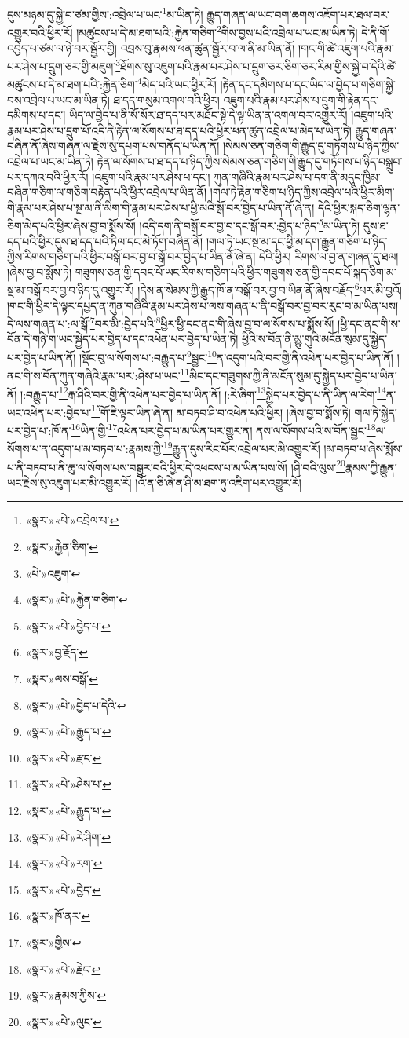 དུས་མཉམ་དུ་སྐྱེ་བ་ཙམ་གྱིས་:འབྲེལ་པ་ཡང་\footnote{«སྣར་»«པེ་»འབྲེལ་པ་}མ་ཡིན་ཏེ། རྒྱུད་གཞན་ལ་ཡང་བག་ཆགས་འཇོག་པར་ཐལ་བར་འགྱུར་བའི་ཕྱིར་རོ། །མཚུངས་པ་དེ་མ་ཐག་པའི་:རྐྱེན་གཅིག་\footnote{«སྣར་»རྐྱེན་ཅིག་}གིས་བྱས་པའི་འབྲེལ་པ་ཡང་མ་ཡིན་ཏེ། དེ་ནི་གོ་འབྱེད་པ་ཙམ་ལ་ཉེ་བར་སྦྱོར་གྱི། འབྲས་བུ་རྣམས་ཕན་ཚུན་སྦྱོར་བ་ལ་ནི་མ་ཡིན་ནོ། །གང་གི་ཚེ་འཇུག་པའི་རྣམ་པར་ཤེས་པ་དྲུག་ཅར་གྱི་མཇུག་\footnote{«པེ་»འཇུག་}ཐོགས་སུ་འཇུག་པའི་རྣམ་པར་ཤེས་པ་དྲུག་ཅར་ཅིག་ཅར་རིམ་གྱིས་སྐྱེ་བ་དེའི་ཚེ་མཚུངས་པ་དེ་མ་ཐག་པའི་:རྐྱེན་ཅིག་\footnote{«སྣར་»«པེ་»རྐྱེན་གཅིག་}མེད་པའི་ཡང་ཕྱིར་རོ། །རྟེན་དང་དམིགས་པ་དང་ཡིད་ལ་བྱེད་པ་གཅིག་སྐྱེ་བས་འབྲེལ་པ་ཡང་མ་ཡིན་ཏེ། ཐ་དད་གསུམ་འགལ་བའི་ཕྱིར། འཇུག་པའི་རྣམ་པར་ཤེས་པ་དྲུག་གི་རྟེན་དང་དམིགས་པ་དང་། ཡིད་ལ་བྱེད་པ་ནི་སོ་སོར་ཐ་དད་པར་མཐོང་སྟེ་དེ་ལྟ་ཡིན་ན་འགལ་བར་འགྱུར་རོ། །འཇུག་པའི་རྣམ་པར་ཤེས་པ་དྲུག་པོ་འདི་ནི་རྟེན་ལ་སོགས་པ་ཐ་དད་པའི་ཕྱིར་ཕན་ཚུན་འབྲེལ་པ་མེད་པ་ཡིན་ཏེ། རྒྱུད་གཞན་བཞིན་ནོ་ཞེས་གཞན་ལ་རྗེས་སུ་དཔག་པས་གནོད་པ་ཡིན་ནོ། །སེམས་ཅན་གཅིག་གི་རྒྱུད་དུ་གཏོགས་པ་ཉིད་ཀྱིས་འབྲེལ་པ་ཡང་མ་ཡིན་ཏེ། རྟེན་ལ་སོགས་པ་ཐ་དད་པ་ཉིད་ཀྱིས་སེམས་ཅན་གཅིག་གི་རྒྱུད་དུ་གཏོགས་པ་ཉིད་བསྒྲུབ་པར་དཀའ་བའི་ཕྱིར་རོ། །འཇུག་པའི་རྣམ་པར་ཤེས་པ་དང་། ཀུན་གཞིའི་རྣམ་པར་ཤེས་པ་དག་ནི་མདུང་ཁྱིམ་བཞིན་གཅིག་ལ་གཅིག་བརྟེན་པའི་ཕྱིར་འབྲེལ་པ་ཡིན་ནོ། །གལ་ཏེ་རྟེན་གཅིག་པ་ཉིད་ཀྱིས་འབྲེལ་པའི་ཕྱིར་མིག་གི་རྣམ་པར་ཤེས་པ་སྔ་མ་ནི་མིག་གི་རྣམ་པར་ཤེས་པ་ཕྱི་མའི་སྒོ་བར་བྱེད་པ་ཡིན་ནོ་ཞེ་ན། དེའི་ཕྱིར་སྐད་ཅིག་ལྷན་ཅིག་མེད་པའི་ཕྱིར་ཞེས་བྱ་བ་སྨོས་སོ། །འདི་དག་ནི་བསྒོ་བར་བྱ་བ་དང་སྒོ་བར་:བྱེད་པ་ཉིད་\footnote{«སྣར་»«པེ་»བྱེད་པ་}མ་ཡིན་ཏེ། དུས་ཐ་དད་པའི་ཕྱིར་དུས་ཐ་དད་པའི་ཏིལ་དང་མེ་ཏོག་བཞིན་ནོ། །གལ་ཏེ་ཡང་སྔ་མ་དང་ཕྱི་མ་དག་རྒྱུན་གཅིག་པ་ཉིད་ཀྱིས་རིགས་གཅིག་པའི་ཕྱིར་བསྒོ་བར་བྱ་བ་སྒོ་བར་བྱེད་པ་ཡིན་ནོ་ཞེ་ན། དེའི་ཕྱིར། རིགས་ལ་བྱ་ན་གཞན་དུ་ཐལ། །ཞེས་བྱ་བ་སྨོས་ཏེ། གཟུགས་ཅན་གྱི་དབང་པོ་ཡང་རིགས་གཅིག་པའི་ཕྱིར་གཟུགས་ཅན་གྱི་དབང་པོ་སྐད་ཅིག་མ་སྔ་མ་བསྒོ་བར་བྱ་བ་ཉིད་དུ་འགྱུར་རོ། །དེས་ན་སེམས་ཀྱི་རྒྱུད་ཁོ་ན་བསྒོ་བར་བྱ་བ་ཡིན་ནོ་ཞེས་བརྗོད་\footnote{«སྣར་»བྱ་རྗོད་}པར་མི་བྱའོ། །གང་གི་ཕྱིར་དེ་ལྟར་དཔྱད་ན་ཀུན་གཞིའི་རྣམ་པར་ཤེས་པ་ལས་གཞན་པ་ནི་བསྒོ་བར་བྱ་བར་རུང་བ་མ་ཡིན་པས། དེ་ལས་གཞན་པ་:ལ་སྒོ་\footnote{«སྣར་»ལས་བསྒོ་}བར་མི་:བྱེད་པའི་\footnote{«སྣར་»«པེ་»བྱེད་པ་དེའི་}ཕྱིར་ཕྱི་དང་ནང་གི་ཞེས་བྱ་བ་ལ་སོགས་པ་སྨོས་སོ། །ཕྱི་དང་ནང་གི་ས་བོན་དེ་གཉི་ག་ཡང་སྐྱེད་པར་བྱེད་པ་དང་འཕེན་པར་བྱེད་པ་ཡིན་ཏེ། ཕྱིའི་ས་བོན་ནི་མྱུ་གུའི་མངོན་སུམ་དུ་སྐྱེད་པར་བྱེད་པ་ཡིན་ནོ། །སྡོང་བུ་ལ་སོགས་པ་:བརྒྱུད་པ་\footnote{«སྣར་»«པེ་»རྒྱུད་པ་}སྦྱང་\footnote{«སྣར་»«པེ་»རྫང་}ན་འདུག་པའི་བར་གྱི་ནི་འཕེན་པར་བྱེད་པ་ཡིན་ནོ། །ནང་གི་ས་བོན་ཀུན་གཞིའི་རྣམ་པར་:ཤེས་པ་ཡང་\footnote{«སྣར་»«པེ་»ཤེས་པ་}མིང་དང་གཟུགས་ཀྱི་ནི་མངོན་སུམ་དུ་སྐྱེད་པར་བྱེད་པ་ཡིན་ནོ། །:བརྒྱུད་པ་\footnote{«སྣར་»«པེ་»རྒྱུད་པ་}རྒ་ཤིའི་བར་གྱི་ནི་འཕེན་པར་བྱེད་པ་ཡིན་ནོ། །:རེ་ཞིག་\footnote{«སྣར་»«པེ་»རེ་ཤིག་}སྐྱེད་པར་བྱེད་པ་ནི་ཡིན་ལ་རེག་\footnote{«སྣར་»«པེ་»རག་}ན་ཡང་འཕེན་པར་:བྱེད་པ་\footnote{«སྣར་»«པེ་»བྱེད་}གོ་ཇི་ལྟར་ཡིན་ཞེ་ན། མ་བཏབ་ཤི་བ་འཕེན་པའི་ཕྱིར། །ཞེས་བྱ་བ་སྨོས་ཏེ། གལ་ཏེ་སྐྱེད་པར་བྱེད་པ་:ཁོ་ན་\footnote{«སྣར་»ཁོ་ནར་}ཡིན་གྱི་\footnote{«སྣར་»གྱིས་}འཕེན་པར་བྱེད་པ་མ་ཡིན་པར་གྱུར་ན། ནས་ལ་སོགས་པའི་ས་བོན་སྦྱང་\footnote{«སྣར་»«པེ་»རྗེང་}ལ་སོགས་པ་ན་འདུག་པ་མ་བཏབ་པ་:རྣམས་ཀྱི་\footnote{«སྣར་»རྣམས་ཀྱིས་}རྒྱུན་དུས་རིང་པོར་འབྲེལ་པར་མི་འགྱུར་རོ། །མ་བཏབ་པ་ཞེས་སྨོས་པ་ནི་བཏབ་པ་ནི་ཆུ་ལ་སོགས་པས་བསྒྱུར་བའི་ཕྱིར་དེ་འཕངས་པ་མ་ཡིན་པས་སོ། །ཤི་བའི་ལུས་\footnote{«སྣར་»«པེ་»ལུང་}རྣམས་ཀྱི་རྒྱུན་ཡང་རྗེས་སུ་འཇུག་པར་མི་འགྱུར་རོ། །འོ་ན་ཅི་ཞེ་ན་ཤི་མ་ཐག་ཏུ་འཇིག་པར་འགྱུར་རོ། 
